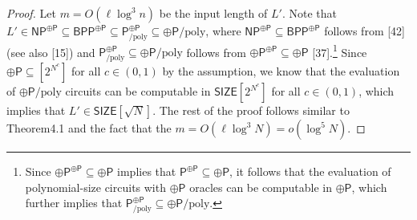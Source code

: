 \begin{proof}
Let $m=O(\ell\log^3n)$ be the input length of $L'$. Note that $L'\in\mathsf{NP}^{\oplus\mathsf P}\subseteq\mathsf{BPP}^{\oplus\mathsf P}\subseteq\mathsf P_{/\mathrm{poly}}^{\oplus\mathsf P}\subseteq\oplus\mathsf P/\mathrm{poly}$, where $\mathsf{NP}^{\oplus\mathsf P}\subseteq\mathsf{BPP}^{\oplus\mathsf P}$ follows from [42] (see also [15]) and $\mathsf P_{/\mathrm{poly}}^{\oplus\mathsf P}\subseteq\oplus\mathsf P/\mathrm{poly}$ follows from $\oplus\mathsf P^{\oplus\mathsf P}\subseteq\oplus\mathsf P$ [37].\footnote{Since $\oplus\mathsf P^{\oplus\mathsf P}\subseteq\oplus\mathsf P$ implies that $\mathsf P^{\oplus\mathsf P}\subseteq\oplus\mathsf P$, it follows that the evaluation of polynomial-size circuits with $\oplus\mathsf P$ oracles can be computable in $\oplus\mathsf P$, which further implies that $\mathsf P_{/\mathrm{poly}}^{\oplus\mathsf P}\subseteq\oplus\mathsf P/\mathrm{poly}$.} Since $\oplus\mathsf P\subseteq[2^{N^c}]$ for all $c\in(0,1)$ by the assumption, we know that the evaluation of $\oplus\mathsf P/\mathrm{poly}$ circuits can be computable in $\mathsf{SIZE}[2^{N^c}]$ for all $c\in(0,1)$, which implies that $L'\in\mathsf{SIZE}[\sqrt N]$. The rest of the proof follows similar to Theorem4.1 and the fact that the $m=O(\ell\log^3N)=o(\log^5N)$.
\end{proof}
